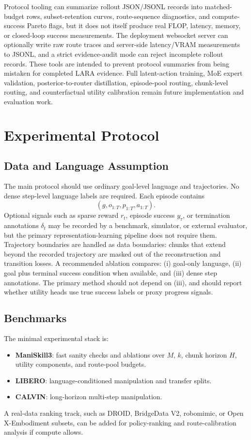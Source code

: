 \documentclass[10pt]{article}
\begin{document}
Protocol tooling can summarize rollout JSON/JSONL records into matched-budget
rows, subset-retention curves, route-sequence diagnostics, and compute-success
Pareto flags, but it does not itself produce real FLOP, latency, memory, or
closed-loop success measurements. The deployment websocket server can
optionally write raw route traces and server-side latency/VRAM measurements to
JSONL, and a strict evidence-audit mode can reject incomplete rollout records.
These tools are intended to prevent protocol summaries from being mistaken for
completed LARA evidence. Full latent-action training, MoE expert validation,
posterior-to-router distillation, episode-pool routing, chunk-level routing,
and counterfactual utility calibration remain future implementation and
evaluation work.

\section{Experimental Protocol}

\subsection{Data and Language Assumption}

The main protocol should use ordinary goal-level language and trajectories. No dense step-level language labels are required. Each episode contains
\begin{equation}
(g,o_{1:T},p_{1:T},a_{1:T}).
\end{equation}
Optional signals such as sparse reward $r_t$, episode success $y_\tau$, or termination annotations $\delta_t$ may be recorded by a benchmark, simulator, or external evaluator, but the primary representation-learning pipeline does not require them. Trajectory boundaries are handled as data boundaries: chunks that extend beyond the recorded trajectory are masked out of the reconstruction and transition losses. A recommended ablation compares: (i) goal-only language, (ii) goal plus terminal success condition when available, and (iii) dense step annotations. The primary method should not depend on (iii), and should report whether utility heads use true success labels or proxy progress signals.

\subsection{Benchmarks}

The minimal experimental stack is:
\begin{itemize}
  \item \textbf{ManiSkill3}: fast sanity checks and ablations over $M$, $k$, chunk horizon $H$, utility components, and route-pool budgets.
  \item \textbf{LIBERO}: language-conditioned manipulation and transfer splits.
  \item \textbf{CALVIN}: long-horizon multi-step manipulation.
\end{itemize}
A real-data ranking track, such as DROID, BridgeData V2, robomimic, or Open X-Embodiment subsets, can be added for policy-ranking and route-calibration analysis if compute allows.
\end{document}
